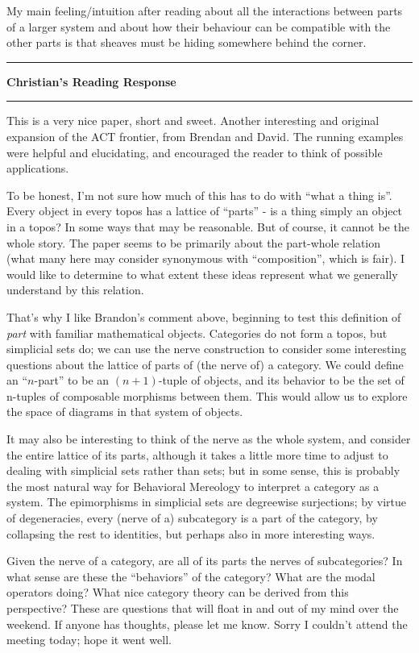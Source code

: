 \documentclass{amsart}
\newcommand{\iam}[1]{
  \vspace{0.25em}
  \hrule
  \vspace{0.25em}
  \textbf{{#1}'s Reading Response}
  \vspace{0.25em}
  \hrule
  \vspace{1em}
}
\begin{document}
My main feeling/intuition after reading about all the interactions between parts of a larger system and about how their behaviour can be compatible with the other parts is that sheaves must be hiding somewhere behind the corner.

\iam{Christian}

This is a very nice paper, short and sweet. Another interesting and original expansion of the ACT frontier, from Brendan and David. The running examples were helpful and elucidating, and encouraged the reader to think of possible applications.

To be honest, I'm not sure how much of this has to do with ``what a thing is''. Every object in every topos has a lattice of ``parts'' - is a thing simply an object in a topos? In some ways that may be reasonable. But of course, it cannot be the whole story. The paper seems to be primarily about the part-whole relation (what many here may consider synonymous with ``composition'', which is fair). I would like to determine to what extent these ideas represent what we generally understand by this relation.

That's why I like Brandon's comment above, beginning to test this definition of \textit{part} with familiar mathematical objects. Categories do not form a topos, but simplicial sets do; we can use the nerve construction to consider some interesting questions about the lattice of parts of (the nerve of) a category. We could define an ``$n$-part'' to be an $(n+1)$-tuple of objects, and its behavior to be the set of n-tuples of composable morphisms between them. This would allow us to explore the space of diagrams in that system of objects.

It may also be interesting to think of the nerve as the whole system, and consider the entire lattice of its parts, although it takes a little more time to adjust to dealing with simplicial sets rather than sets; but in some sense, this is probably the most natural way for Behavioral Mereology to interpret a category as a system. The epimorphisms in simplicial sets are degreewise surjections; by virtue of degeneracies, every (nerve of a) subcategory is a part of the category, by collapsing the rest to identities, but perhaps also in more interesting ways.

Given the nerve of a category, are all of its parts the nerves of subcategories? In what sense are these the ``behaviors'' of the category? What are the modal operators doing? What nice category theory can be derived from this perspective? These are questions that will float in and out of my mind over the weekend. If anyone has thoughts, please let me know. Sorry I couldn't attend the meeting today; hope it went well.
\end{document}
